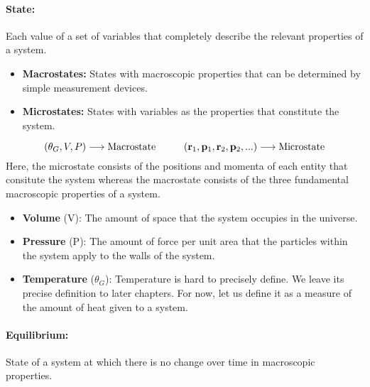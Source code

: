     \paragraph{State:}Each value of a set of variables that completely describe the relevant properties of a system. 
    \begin{itemize}
        \item \textbf{Macrostates:} States with macroscopic properties that can be determined by simple measurement devices.
        \item \textbf{Microstates:} States with variables as the properties that constitute the system.
    \end{itemize}
    \begin{equation*}
        (\theta_G, V, P) \longrightarrow \text{Macrostate} \hspace{1cm} (\mathbf{r}_1,\mathbf{p}_1,\mathbf{r}_2,\mathbf{p}_2,...) \longrightarrow \text{Microstate}    
    \end{equation*}
    Here, the microstate consists of the positions and momenta of each entity that consitute the system whereas the macrostate consists of the three fundamental macroscopic properties of a system.
    \begin{itemize}
        \item \textbf{Volume} (V): The amount of space that the system occupies in the universe.
        \item \textbf{Pressure} (P): The amount of force per unit area that the particles within the system apply to the walls of the system.
        \item \textbf{Temperature} ($\theta_G$): Temperature is hard to precisely define. We leave its precise definition to later chapters. For now, let us define it as a measure of the amount of heat given to a system.
    \end{itemize}
    \paragraph{Equilibrium:}State of a system at which there is no change over time in macroscopic properties. 
    
